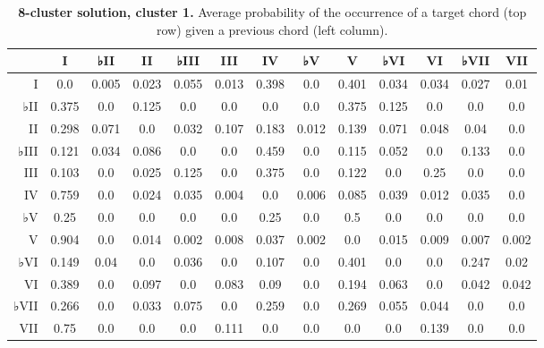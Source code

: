 \begin{table}[htbp]
\begin{minipage}{\linewidth}
\setlength{\tymax}{0.5\linewidth}
\centering
\small
\caption{\textbf{8-cluster solution, cluster 1.} Average probability of the occurrence of a target chord (top row) given a previous chord (left column).}
\label{8-clustersolutioncluster1.averageprobabilityoftheoccurrenceofatargetchordtoprowgivenapreviouschordleftcolumn.}
\begin{tabulary}{\textwidth}{@{}RCCCCCCCCCCCC@{}} \toprule
&I&♭II&II&♭III&III&IV&♭V&V&♭VI&VI&♭VII&VII\\
\midrule
I&0.0&0.005&0.023&0.055&0.013&0.398&0.0&0.401&0.034&0.034&0.027&0.01\\
♭II&0.375&0.0&0.125&0.0&0.0&0.0&0.0&0.375&0.125&0.0&0.0&0.0\\
II&0.298&0.071&0.0&0.032&0.107&0.183&0.012&0.139&0.071&0.048&0.04&0.0\\
♭III&0.121&0.034&0.086&0.0&0.0&0.459&0.0&0.115&0.052&0.0&0.133&0.0\\
III&0.103&0.0&0.025&0.125&0.0&0.375&0.0&0.122&0.0&0.25&0.0&0.0\\
IV&0.759&0.0&0.024&0.035&0.004&0.0&0.006&0.085&0.039&0.012&0.035&0.0\\
♭V&0.25&0.0&0.0&0.0&0.0&0.25&0.0&0.5&0.0&0.0&0.0&0.0\\
V&0.904&0.0&0.014&0.002&0.008&0.037&0.002&0.0&0.015&0.009&0.007&0.002\\
♭VI&0.149&0.04&0.0&0.036&0.0&0.107&0.0&0.401&0.0&0.0&0.247&0.02\\
VI&0.389&0.0&0.097&0.0&0.083&0.09&0.0&0.194&0.063&0.0&0.042&0.042\\
♭VII&0.266&0.0&0.033&0.075&0.0&0.259&0.0&0.269&0.055&0.044&0.0&0.0\\
VII&0.75&0.0&0.0&0.0&0.111&0.0&0.0&0.0&0.0&0.139&0.0&0.0\\

\bottomrule

\end{tabulary}
\end{minipage}
\end{table}

